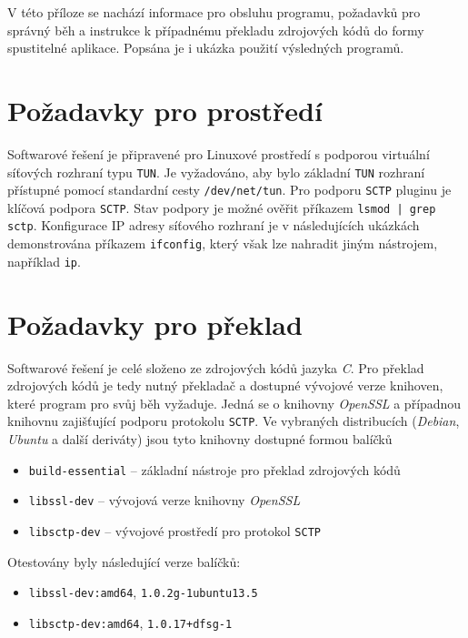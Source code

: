 \documentclass[thesis=M,czech]{FITthesis}[2012/10/20]
\begin{document}
V této příloze se nachází informace pro obsluhu programu, požadavků pro správný běh a instrukce k případnému překladu zdrojových kódů do formy spustitelné aplikace. Popsána je i ukázka použití výsledných programů.

\section{Požadavky pro prostředí}

Softwarové řešení je připravené pro Linuxové prostředí s podporou virtuální síťových rozhraní typu \texttt{TUN}. Je vyžadováno, aby bylo základní \texttt{TUN} rozhraní přístupné pomocí standardní cesty \texttt{/dev/net/tun}. Pro podporu \texttt{SCTP} pluginu je klíčová podpora \texttt{SCTP}. Stav podpory je možné ověřit příkazem \verb=lsmod | grep sctp=. Konfigurace IP adresy síťového rozhraní je v následujících ukázkách demonstrována příkazem \texttt{ifconfig}, který však lze nahradit jiným nástrojem, například \texttt{ip}.

\section{Požadavky pro překlad}

Softwarové řešení je celé složeno ze zdrojových kódů jazyka \textit{C}. Pro překlad zdrojových kódů je tedy nutný překladač a dostupné vývojové verze knihoven, které program pro svůj běh vyžaduje. Jedná se o knihovny \textit{OpenSSL} a případnou knihovnu zajišťující podporu protokolu \texttt{SCTP}. Ve vybraných distribucích (\textit{Debian}, \textit{Ubuntu} a další deriváty) jsou tyto knihovny dostupné formou balíčků

\begin{itemize}
 \item \texttt{build-essential} -- základní nástroje pro překlad zdrojových kódů
 \item \texttt{libssl-dev} -- vývojová verze knihovny \textit{OpenSSL}
 \item \texttt{libsctp-dev} -- vývojové prostředí pro protokol \texttt{SCTP}
\end{itemize}

Otestovány byly následující verze balíčků:

\begin{itemize}
  \item \texttt{libssl-dev:amd64}, \texttt{1.0.2g-1ubuntu13.5}
 \item \texttt{libsctp-dev:amd64}, \texttt{1.0.17+dfsg-1}
\end{itemize}
\end{document}
